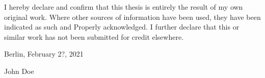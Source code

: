 
I hereby declare and confirm that this thesis is entirely the result of my own original work. Where other sources of information have been used, they have been indicated as such and Properly acknowledged. I further declare that this or similar work has not been submitted for credit elsewhere.


\vskip 1cm

Berlin, February 2?, 2021

\vskip 1.5cm

John Doe